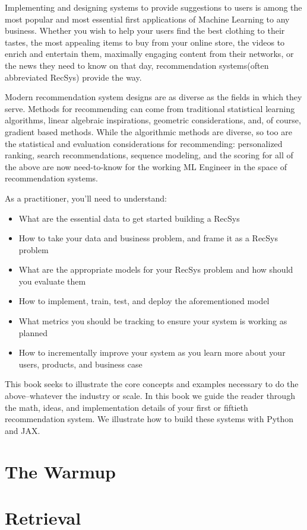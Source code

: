 \documentclass{book}
\begin{document}
Implementing and designing systems to provide suggestions to users is among the most popular and most essential first applications of Machine Learning to any business. Whether you wish to help your users find the best clothing to their tastes, the most appealing items to buy from your online store, the videos to enrich and entertain them, maximally engaging content from their networks, or the news they need to know on that day, recommendation systems(often abbreviated RecSys) provide the way.

Modern recommendation system designs are as diverse as the fields in which they serve. Methods for recommending can come from traditional statistical learning algorithms, linear algebraic inspirations, geometric considerations, and, of course, gradient based methods. While the algorithmic methods are diverse, so too are the statistical and evaluation considerations for recommending: personalized ranking, search recommendations, sequence modeling, and the scoring for all of the above are now need-to-know for the working ML Engineer in the space of recommendation systems.

As a practitioner, you’ll need to understand:
\begin{itemize}
    \item What are the essential data to get started building a RecSys
    \item How to take your data and business problem, and frame it as a RecSys problem
    \item What are the appropriate models for your RecSys problem and how should you evaluate them
    \item How to implement, train, test, and deploy the aforementioned model
    \item What metrics you should be tracking to ensure your system is working as planned
    \item How to incrementally improve your system as you learn more about your users, products, and business case
\end{itemize}

This book seeks to illustrate the core concepts and examples necessary to do the above–whatever the industry or scale. In this book we guide the reader through the math, ideas, and implementation details of your first or fiftieth recommendation system. We illustrate how to build these systems with Python and JAX.

\cleardoublepage


\part{The Warmup}









\part{Retrieval}


% 


\end{document}

